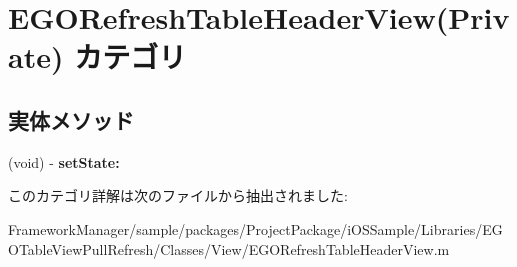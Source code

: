 \hypertarget{category_e_g_o_refresh_table_header_view_07_private_08}{}\section{E\+G\+O\+Refresh\+Table\+Header\+View(Private) カテゴリ}
\label{category_e_g_o_refresh_table_header_view_07_private_08}
\subsection*{実体メソッド}
\begin{DoxyCompactItemize}
\item 
\hypertarget{category_e_g_o_refresh_table_header_view_07_private_08_ad082392bbd824297918c74251a01e227}{}(void) -\/ {\bfseries set\+State\+:}\label{category_e_g_o_refresh_table_header_view_07_private_08_ad082392bbd824297918c74251a01e227}

\end{DoxyCompactItemize}


このカテゴリ詳解は次のファイルから抽出されました\+:\begin{DoxyCompactItemize}
\item 
Framework\+Manager/sample/packages/\+Project\+Package/i\+O\+S\+Sample/\+Libraries/\+E\+G\+O\+Table\+View\+Pull\+Refresh/\+Classes/\+View/E\+G\+O\+Refresh\+Table\+Header\+View.\+m\end{DoxyCompactItemize}
